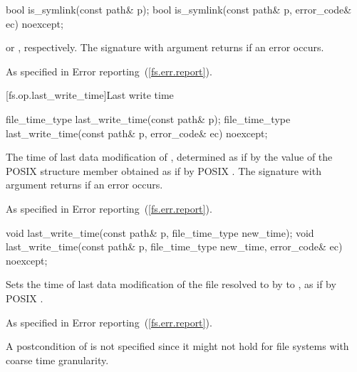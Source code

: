 %
\begin{itemdecl}
bool is_symlink(const path& p);
bool is_symlink(const path& p, error_code& ec) noexcept;
\end{itemdecl}

\begin{itemdescr}
\pnum
\returns {} or ,
  respectively. The signature with argument  returns 
  if an error occurs.

\pnum
\throws As specified in Error reporting~(\ref{fs.err.report}).
\end{itemdescr}


[fs.op.last_write_time]{Last write time}

%
\begin{itemdecl}
file_time_type last_write_time(const path& p);
file_time_type last_write_time(const path& p, error_code& ec) noexcept;
\end{itemdecl}

\begin{itemdescr}
\pnum
\returns The time of last data modification of ,
  determined as if by the value of the POSIX  structure member 
  obtained as if by POSIX .
  The signature with argument  returns 
  if an error occurs.

\pnum
\throws As specified in Error reporting~(\ref{fs.err.report}).
\end{itemdescr}

%
\begin{itemdecl}
void last_write_time(const path& p, file_time_type new_time);
void last_write_time(const path& p, file_time_type new_time,
                     error_code& ec) noexcept;
\end{itemdecl}

\begin{itemdescr}
\pnum
\effects Sets the time of last data modification of the file
  resolved to by  to , as if by POSIX .

\pnum
\throws As specified in Error reporting~(\ref{fs.err.report}).

\pnum
\begin{note} A postcondition of  is not specified since it might not hold for file systems
  with coarse time granularity. \end{note}
\end{itemdescr}

